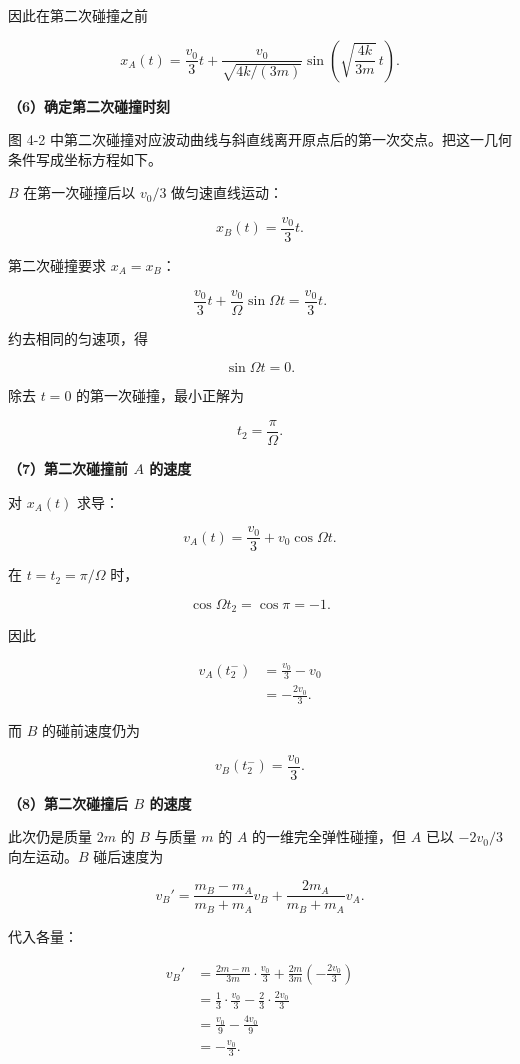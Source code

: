 \documentclass[12pt,a4paper,UTF8]{ctexart}
\begin{document}
因此在第二次碰撞之前

\[
\boxed{
x_A(t)=\frac{v_0}{3}t
+\frac{v_0}{\sqrt{4k/(3m)}}
\sin\!\left(\sqrt{\frac{4k}{3m}}\,t\right)
}.
\]

\textbf{（6）确定第二次碰撞时刻}

图 4-2
中第二次碰撞对应波动曲线与斜直线离开原点后的第一次交点。把这一几何条件写成坐标方程如下。

\(B\) 在第一次碰撞后以 \(v_0/3\) 做匀速直线运动：

\[
x_B(t)=\frac{v_0}{3}t.
\]

第二次碰撞要求 \(x_A=x_B\)：

\[
\frac{v_0}{3}t+\frac{v_0}{\Omega}\sin\Omega t
=\frac{v_0}{3}t.
\]

约去相同的匀速项，得

\[
\sin\Omega t=0.
\]

除去 \(t=0\) 的第一次碰撞，最小正解为

\[
\boxed{t_2=\frac{\pi}{\Omega}}.
\]

\textbf{（7）第二次碰撞前 \(A\) 的速度}

对 \(x_A(t)\) 求导：

\[
v_A(t)=\frac{v_0}{3}+v_0\cos\Omega t.
\]

在 \(t=t_2=\pi/\Omega\) 时，

\[
\cos\Omega t_2=\cos\pi=-1.
\]

因此

\[
\begin{aligned}
v_A(t_2^-)
&=\frac{v_0}{3}-v_0\\
&=-\frac{2v_0}{3}.
\end{aligned}
\]

而 \(B\) 的碰前速度仍为

\[v_B(t_2^-)=\frac{v_0}{3}.\]

\textbf{（8）第二次碰撞后 \(B\) 的速度}

此次仍是质量 \(2m\) 的 \(B\) 与质量 \(m\) 的 \(A\)
的一维完全弹性碰撞，但 \(A\) 已以 \(-2v_0/3\) 向左运动。\(B\) 碰后速度为

\[
v_B'
=\frac{m_B-m_A}{m_B+m_A}v_B
+\frac{2m_A}{m_B+m_A}v_A.
\]

代入各量：

\[
\begin{aligned}
v_B'
&=\frac{2m-m}{3m}\cdot\frac{v_0}{3}
+\frac{2m}{3m}\left(-\frac{2v_0}{3}\right)\\
&=\frac13\cdot\frac{v_0}{3}
-\frac23\cdot\frac{2v_0}{3}\\
&=\frac{v_0}{9}-\frac{4v_0}{9}\\
&=-\frac{v_0}{3}.
\end{aligned}
\]
\end{document}
